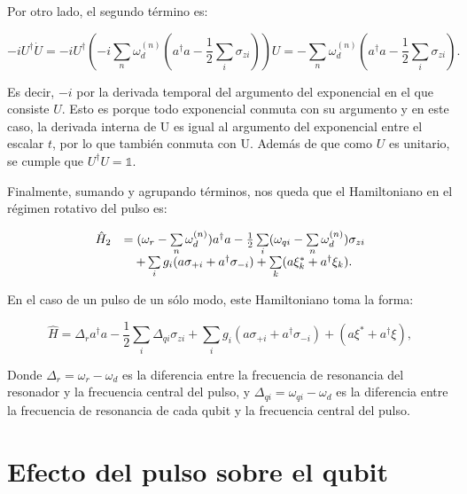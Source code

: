 Por otro lado, el segundo término es:

\begin{equation}
    - i U^\dagger \dot{U} = -i U^\dagger (-i \sum\limits_n \omega_d^{(n)} (a^\dagger a - \frac{1}{2} \sum\limits_i \sigma_{z i})) U = - \sum\limits_n \omega_d^{(n)}(a^\dagger a - \frac{1}{2} \sum\limits_i \sigma_{z i}) .
\end{equation}

Es decir, $-i$ por la derivada temporal del argumento del exponencial en el que consiste $U$. Esto es porque todo exponencial conmuta con su argumento y en este caso, la derivada interna de U es igual al argumento del exponencial entre el escalar $t$, por lo que también conmuta con U. Además de que como $U$ es unitario, se cumple que $U^\dagger U = \mathds{1}$.

Finalmente, sumando y agrupando términos, nos queda que el Hamiltoniano en el régimen rotativo del pulso es:

\begin{equation}
    \begin{array}{r l}
        \hat{H}_2 &= (\omega_r - \sum\limits_n \omega_d^{(n)}) a^\dag a - \frac{1}{2} \sum\limits_i (\omega_{qi} - \sum\limits_n \omega_d^{(n)}) \sigma_{zi} \\
                  &\quad + \sum\limits_i g_i (a \sigma_{+ i} + a^\dagger \sigma_{- i}) + \sum\limits_k (a\xi_k^* + a^\dagger\xi_k) .
    \end{array}
\end{equation}

En el caso de un pulso de un sólo modo, este Hamiltoniano toma la forma:

\begin{equation}
    \hat{H} = \Delta_r a^\dagger a - \frac{1}{2} \sum\limits_i \Delta_{qi} \sigma_{zi} + \sum\limits_i g_i (a \sigma_{+ i} + a^\dagger \sigma_{- i}) + (a\xi^*+a^\dagger\xi ) ,
\end{equation}

Donde $\Delta_r = \omega_r - \omega_d$ es la diferencia entre la frecuencia de resonancia del resonador y la frecuencia central del pulso, y $\Delta_{qi} = \omega_{qi} - \omega_d$ es la diferencia entre la frecuencia de resonancia de cada qubit y la frecuencia central del pulso.

\section{Efecto del pulso sobre el qubit}

